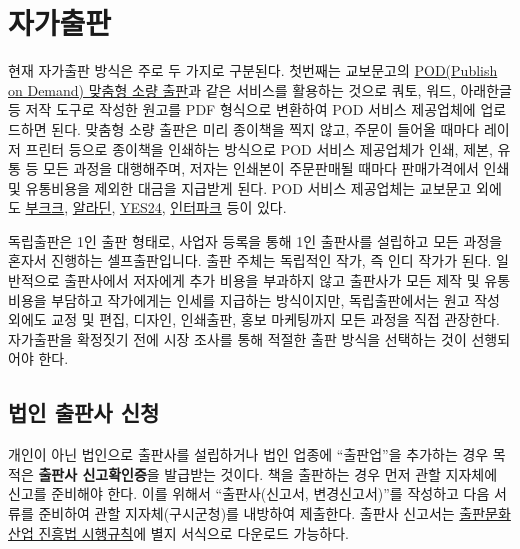 \documentclass[
  letterpaper,
]{book}
\begin{document}
\hypertarget{uxc790uxac00uxcd9cuxd310}{%
\section{자가출판}\label{uxc790uxac00uxcd9cuxd310}}

현재 자가출판 방식은 주로 두 가지로 구분된다. 첫번째는 교보문고의
\href{https://product.kyobobook.co.kr/pod/main}{POD(Publish on Demand)
맞춤형 소량 출판}과 같은 서비스를 활용하는 것으로 쿼토, 워드, 아래한글
등 저작 도구로 작성한 원고를 PDF 형식으로 변환하여 POD 서비스 제공업체에
업로드하면 된다. 맞춤형 소량 출판은 미리 종이책을 찍지 않고, 주문이
들어올 때마다 레이저 프린터 등으로 종이책을 인쇄하는 방식으로 POD 서비스
제공업체가 인쇄, 제본, 유통 등 모든 과정을 대행해주며, 저자는 인쇄본이
주문판매될 때마다 판매가격에서 인쇄 및 유통비용을 제외한 대금을 지급받게
된다. POD 서비스 제공업체는 교보문고 외에도
\href{https://bookk.co.kr/}{부크크},
\href{https://www.aladin.co.kr/}{알라딘},
\href{http://www.yes24.com/}{YES24},
\href{http://book.interpark.com/}{인터파크} 등이 있다.

독립출판은 1인 출판 형태로, 사업자 등록을 통해 1인 출판사를 설립하고
모든 과정을 혼자서 진행하는 셀프출판입니다. 출판 주체는 독립적인 작가,
즉 인디 작가가 된다. 일반적으로 출판사에서 저자에게 추가 비용을 부과하지
않고 출판사가 모든 제작 및 유통 비용을 부담하고 작가에게는 인세를
지급하는 방식이지만, 독립출판에서는 원고 작성 외에도 교정 및 편집,
디자인, 인쇄출판, 홍보 마케팅까지 모든 과정을 직접 관장한다. 자가출판을
확정짓기 전에 시장 조사를 통해 적절한 출판 방식을 선택하는 것이
선행되어야 한다.

\hypertarget{uxbc95uxc778-uxcd9cuxd310uxc0ac-uxc2e0uxccad}{%
\subsection{법인 출판사
신청}\label{uxbc95uxc778-uxcd9cuxd310uxc0ac-uxc2e0uxccad}}

개인이 아닌 법인으로 출판사를 설립하거나 법인 업종에 ``출판업''을
추가하는 경우 목적은 \textbf{출판사 신고확인증}을 발급받는 것이다. 책을
출판하는 경우 먼저 관할 지자체에 신고를 준비해야 한다. 이를 위해서
``출판사(신고서, 변경신고서)''를 작성하고 다음 서류를 준비하여 관할
지자체(구시군청)를 내방하여 제출한다. 출판사 신고서는
\href{https://www.law.go.kr/\%EB\%B2\%95\%EB\%A0\%B9/\%EC\%B6\%9C\%ED\%8C\%90\%EB\%AC\%B8\%ED\%99\%94\%EC\%82\%B0\%EC\%97\%85\%EC\%A7\%84\%ED\%9D\%A5\%EB\%B2\%95\%EC\%8B\%9C\%ED\%96\%89\%EA\%B7\%9C\%EC\%B9\%99}{출판문화산업
진흥법 시행규칙}에 별지 서식으로 다운로드 가능하다.
\end{document}
